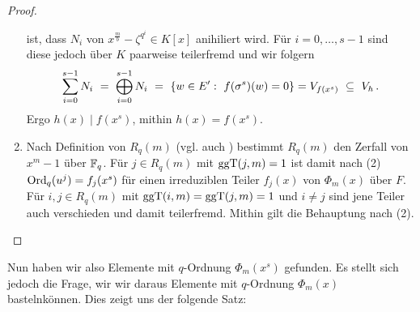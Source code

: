 \begin{proof}
\begin{enumerate}
      ist, dass $N_i$ von $x^{\frac m b}-\zeta^{q^i} \in K[x]$ anihiliert wird.
      Für $i=0,\ldots,s-1$ sind diese jedoch über $K$ paarweise teilerfremd
      und wir folgern
      \[ \sum_{i=0}^{s-1} N_i \ =\  \bigoplus_{i=0}^{s-1} N_i 
        \ =\  \{ w \in E':\ f(\sigma^s)(w) = 0 \} = V_{f(x^s)} 
        \ \subseteq\  V_h\,.\]
      Ergo $h(x) \mid f(x^s)$, mithin $h(x) = f(x^s)$.
    \item Nach Definition von $R_q(m)$ (vgl. auch 
      ) bestimmt $R_q(m)$ den Zerfall
      von $x^m-1$ über $\mathbb{F}_q$. Für $j\in R_q(m)$ mit $\operatorname{ggT}(j,m) = 1$ 
      ist damit nach (2) $\operatorname{Ord}_q(u^j) = f_j(x^s)$ für einen irreduziblen Teiler
      $f_j(x)$ von $\Phi_m(x)$ über $F$. Für $i,j\in R_q(m)$ mit 
      $\operatorname{ggT}(i,m) = \operatorname{ggT}(j,m) = 1$ und $i\neq j$ sind jene Teiler auch
      verschieden und damit teilerfremd. Mithin gilt die Behauptung
      nach  (2).
  \end{enumerate}
\end{proof}

Nun haben wir also Elemente mit $q$-Ordnung $\Phi_m(x^s)$ gefunden. Es stellt
sich jedoch die Frage, wir wir daraus Elemente mit $q$-Ordnung $\Phi_m(x)$ 
\glqq basteln\grqq können. Dies zeigt uns der folgende Satz:

